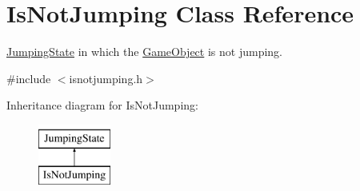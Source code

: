 \hypertarget{classIsNotJumping}{\section{Is\-Not\-Jumping Class Reference}
\label{classIsNotJumping}
}


\hyperlink{classJumpingState}{Jumping\-State} in which the \hyperlink{classGameObject}{Game\-Object} is not jumping.  




{\ttfamily \#include $<$isnotjumping.\-h$>$}

Inheritance diagram for Is\-Not\-Jumping\-:\begin{figure}[H]
\begin{center}
\leavevmode
\includegraphics[height=2.000000cm]{classIsNotJumping}
\end{center}
\end{figure}
